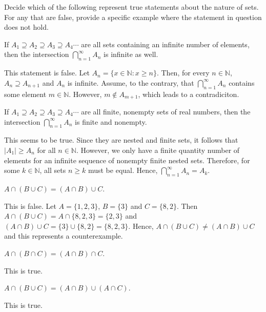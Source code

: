 \documentclass[12pt]{article}
\newcommand{\N}{\mathbb{N}}
\newenvironment{problem}[2][Problem]{\begin{trivlist}
		\item[\hskip \labelsep {\bfseries #1}\hskip \labelsep {\bfseries #2.}]}{\end{trivlist}}
\newenvironment{solution}[2][Solution]{\begin{trivlist}
		\item[\hskip \labelsep {\bfseries #1}\hskip \labelsep {\bfseries #2.}]}{\end{trivlist}}
\begin{document}
	\begin{problem}{1.2.3}
		Decide which of the following represent true statements about the nature of sets. For any that are false, provide a specific example where the statement in question does not hold.
		\begin{enumerate}[label=(\alph*)]
			\item If $A_{1} \supseteq A_{2} \supseteq A_{3} \supseteq A_{4} \cdots$ are all sets containing an infinite number of elements, then the intersection $\bigcap^{\infty}_{n=1} A_{n}$ is infinite as well.
			\begin{solution}{a}
				This statement is false. Let $A_{n} = \{x\in \N: x\geq n\}$. Then, for every $n\in \N$, $A_{n} \supseteq A_{n+1}$ and $A_{n}$ is infinite. Assume, to the contrary, that $\bigcap^{\infty}_{n=1} A_{n}$ contains some element $m\in \N$. However, $m\notin A_{m+1}$, which leads to a contradiciton. 
			\end{solution}
			\item If $A_{1}\supseteq A_{2} \supseteq A_{3} \supseteq A_{4} \cdots$ are all finite, nonempty sets of real numbers, then the intersection $\bigcap_{n=1}^{\infty} A_{n}$ is finite and nonempty.
			\begin{solution}{b}
				This seems to be true. Since they are nested and finite sets, it follows that $|A_{1}| \geq A_{n}$ for all $n\in \N$. However, we only have a finite quantity number of elements for an infinite sequence of nonempty finite nested sets. Therefore, for some $k\in \N$, all sets $n\geq k$ must be equal. Hence, $\bigcap_{n=1}^{\infty} A_{n} = A_{k}$.
			\end{solution}
			\item $A\cap (B\cup C) = (A\cap B)\cup C$.
			\begin{solution}{c}
				This is false. Let $A=\{1,2,3\}$, $B=\{3\}$ and $C=\{8,2\}$. Then $A\cap (B\cup C) = A\cap \{8,2,3\} = \{2,3\}$ and $(A\cap B)\cup C = \{3\}\cup \{8,2\} = \{8,2,3\}$. Hence, $A\cap (B\cup C) \neq (A\cap B)\cup C$ and this represents a counterexample.
			\end{solution}
			
			\item $A\cap (B\cap C) = (A\cap B)\cap C$.
			\begin{solution}{d}
				This is true. 
			\end{solution}
		
			\item $A\cap (B\cup C) = (A\cap B)\cup (A\cap C)$.
			\begin{solution}{e}
				This is true.
			\end{solution}
		\end{enumerate}
	\end{problem}
\end{document}
